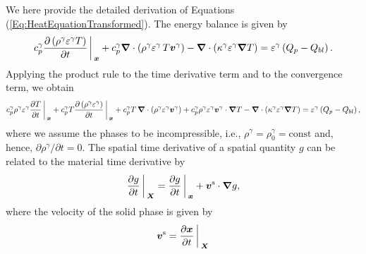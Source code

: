 \documentclass[Times1COL,AMA]{WileyNJDv5} %
\newcommand{\vct}[1]{\boldsymbol{#1}}
\begin{document}



\appendix

 \label{App:SuppEquations}

We here provide the detailed derivation of Equations (\ref{Eq:HeatEquationTransformed}).
The energy balance is given by
\begin{equation}
    c_{p}^{\gamma} \frac{\partial \left( \rho^\gamma \varepsilon^\gamma T \right)}{\partial t}
    \bigg\arrowvert_{\vct{x}}
    +
    c_{p}^{\gamma} \vct{\nabla} \cdot \left( \rho^\gamma \varepsilon^\gamma \, T \vct{v}^\gamma \right)
    -
    \vct{\nabla} \cdot \left( \kappa^\gamma \varepsilon^\gamma \vct{\nabla} T \right)
    =
    \varepsilon^\gamma \left(Q_p - Q_{bl}\right).
\end{equation}
Applying the product rule to the time derivative term and to the convergence term, we obtain
\begin{equation}
    c_{p}^{\gamma} \rho^\gamma \varepsilon^\gamma \frac{\partial T}{\partial t}
    \bigg\arrowvert_{\vct{x}}
    +
    c_{p}^{\gamma} T \frac{\partial \left( \rho^\gamma \varepsilon^\gamma \right)}{\partial t}
    \bigg\arrowvert_{\vct{x}}
    +
    c_{p}^{\gamma} T \, \vct{\nabla} \cdot \left( \rho^\gamma \varepsilon^\gamma \vct{v}^\gamma \right)
    +
    c_{p}^{\gamma} \rho^\gamma \varepsilon^\gamma \vct{v}^\gamma \cdot \vct{\nabla} T
    -
    \vct{\nabla} \cdot \left( \kappa^\gamma \varepsilon^\gamma \vct{\nabla} T \right)
    =
    \varepsilon^\gamma \left(Q_p - Q_{bl}\right),
    \label{Eq:EnergyBalanceProductRule}
\end{equation}
where we assume the phases to be incompressible, i.e., $\rho^\gamma = \rho^\gamma_0 = \text{const}$ and, hence, $\partial \rho^\gamma /\partial t = 0$.
The spatial time derivative of a spatial quantity $g$ can be related to the material time derivative by
\begin{equation}
    \frac{\partial g}{\partial t} \bigg\arrowvert_{\vct{X}}
    = \frac{\partial g}{\partial t} \bigg\arrowvert_{\vct{x}} + \vct{v}^\mathrm{s} \cdot  \vct{\nabla} g,
    \label{Eq:SpatialTimeDerivative}
\end{equation}
where the velocity of the solid phase is given by
\begin{equation}
    \vct{v}^\mathrm{s}
    = \frac{\partial \vct{x}}{\partial t} \bigg\arrowvert_{\vct{X}}
\end{equation}
\end{document}

